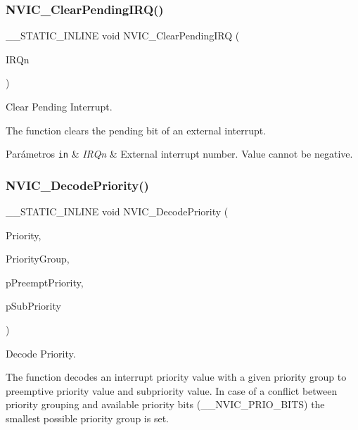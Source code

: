 \subsubsection{\texorpdfstring{N\+V\+I\+C\+\_\+\+Clear\+Pending\+I\+R\+Q()}{NVIC\_ClearPendingIRQ()}}
{\footnotesize\ttfamily \+\_\+\+\_\+\+S\+T\+A\+T\+I\+C\+\_\+\+I\+N\+L\+I\+NE void N\+V\+I\+C\+\_\+\+Clear\+Pending\+I\+RQ (\begin{DoxyParamCaption}\item[{I\+R\+Qn\+\_\+\+Type}]{I\+R\+Qn }\end{DoxyParamCaption})}



Clear Pending Interrupt. 

The function clears the pending bit of an external interrupt.


\begin{DoxyParams}[1]{Parámetros}
\mbox{\tt in}  & {\em I\+R\+Qn} & External interrupt number. Value cannot be negative. \\
\hline
\end{DoxyParams}
\mbox{\label{group___c_m_s_i_s___core___n_v_i_c_functions_ga4f23ef94633f75d3c97670a53949003c}} 
\subsubsection{\texorpdfstring{N\+V\+I\+C\+\_\+\+Decode\+Priority()}{NVIC\_DecodePriority()}}
{\footnotesize\ttfamily \+\_\+\+\_\+\+S\+T\+A\+T\+I\+C\+\_\+\+I\+N\+L\+I\+NE void N\+V\+I\+C\+\_\+\+Decode\+Priority (\begin{DoxyParamCaption}\item[{uint32\+\_\+t}]{Priority,  }\item[{uint32\+\_\+t}]{Priority\+Group,  }\item[{uint32\+\_\+t $\ast$}]{p\+Preempt\+Priority,  }\item[{uint32\+\_\+t $\ast$}]{p\+Sub\+Priority }\end{DoxyParamCaption})}



Decode Priority. 

The function decodes an interrupt priority value with a given priority group to preemptive priority value and subpriority value. In case of a conflict between priority grouping and available priority bits (\+\_\+\+\_\+\+N\+V\+I\+C\+\_\+\+P\+R\+I\+O\+\_\+\+B\+I\+TS) the smallest possible priority group is set.


